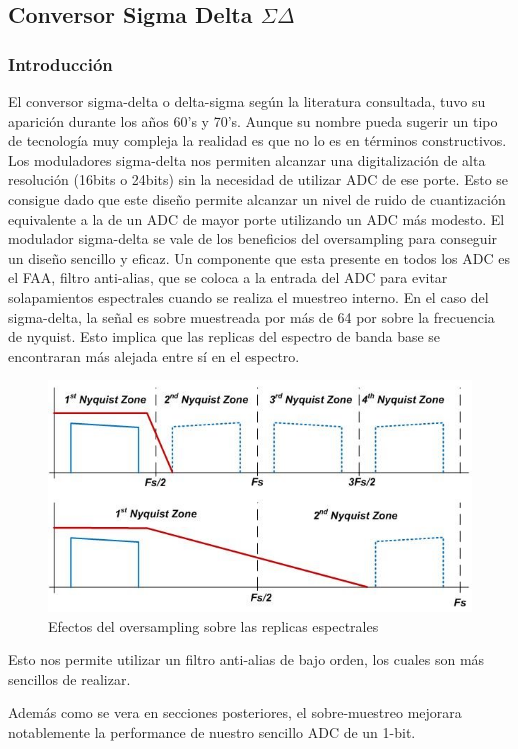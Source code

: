 



\subsection{Conversor Sigma Delta $\Sigma \Delta$}

\subsubsection{Introducción}
El conversor sigma-delta o delta-sigma según la literatura consultada, tuvo su aparición durante los años 60's y 70's. Aunque su nombre pueda sugerir un tipo de tecnología muy compleja la realidad es que no lo es en términos constructivos. Los moduladores sigma-delta nos permiten alcanzar una digitalización de alta resolución (16bits o 24bits) sin la necesidad de utilizar ADC de ese porte. Esto se consigue dado que este diseño permite alcanzar un nivel de ruido de cuantización equivalente a la de un ADC de mayor porte utilizando un ADC más modesto.
El modulador sigma-delta se vale de los beneficios del oversampling para conseguir un diseño sencillo y eficaz.
Un componente que esta presente en todos los ADC es el FAA, filtro anti-alias, que se coloca a la entrada del ADC para evitar solapamientos espectrales cuando se realiza el muestreo interno. En el caso del sigma-delta,  la señal es sobre muestreada por más de 64 por sobre la frecuencia de nyquist. Esto implica que las replicas del espectro de banda base se encontraran más alejada entre sí en el espectro.
\begin{figure}[H]
	\centering
	\includegraphics[width=0.7\linewidth]{ImagenesEjercicio2/Oversampling}
	\caption{Efectos del oversampling sobre las replicas espectrales}
	\label{fig:oversampling}
\end{figure}
Esto nos permite utilizar un filtro anti-alias de bajo orden, los cuales son más sencillos de realizar.


Además como se vera en secciones posteriores, el sobre-muestreo mejorara notablemente la performance de nuestro sencillo ADC de un 1-bit.


